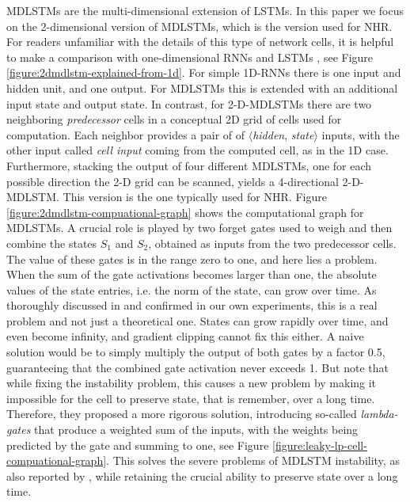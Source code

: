 \documentclass[conference]{IEEEtran}
\renewcommand{\ac}[1]{\gls{#1}}
\renewcommand{\acp}[1]{\glspl{#1}}
\begin{document}
\acp{MDLSTM} \cite{mdlstmsGraves2007} are the multi-dimensional extension of \acp{LSTM}. 
In this paper we focus on the 2-dimensional version of \acp{MDLSTM}, which is the version 
used for \ac{NHR}. For readers unfamiliar with the details of this type of network cells, it is helpful 
to make a comparison with one-dimensional \acp{RNN} and \acp{LSTM} \cite{Hochreiter:1997:LSMT}, 
see Figure \ref{figure:2dmdlstm-explained-from-1d}.
For simple 1D-\acp{RNN} there is one input and hidden unit, and one output. For \acp{MDLSTM} this is extended with an additional 
input state and output state. In contrast, for 2-D-\acp{MDLSTM} there are two 
neighboring \emph{predecessor} cells in a conceptual 2D grid of cells used for computation. Each neighbor provides a pair of 
of $\langle$\emph{hidden}, \emph{state}$\rangle$ inputs, with the other input called \emph{cell input}   
coming from the computed cell, as in the 1D case. 
Furthermore,  stacking the output of four different \acp{MDLSTM}, one for each possible direction 
the 2-D grid can be scanned, yields a 4-directional 2-D-\ac{MDLSTM}. 
This version is the one typically used for \ac{NHR}.
Figure \ref{figure:2dmdlstm-compuational-graph} shows the computational graph for \acp{MDLSTM}. A crucial role is played 
by two forget gates used to weigh and then combine the states $S_1$ and $S_2$, obtained as inputs from the two predecessor cells. 
The value of these gates is in the range zero to one, and here lies a problem. When the sum of the gate activations becomes larger than one, 
the absolute values of the state entries, i.e. the norm of the state, can grow over time. As thoroughly discussed in \cite{LeifertEtAl2014}
and confirmed in our own experiments, this is a real problem and not just a theoretical one. States can grow rapidly over time, 
and even become infinity, and gradient clipping cannot fix this either. A naive solution would be to simply multiply 
the output of both gates by a factor 0.5, guaranteeing that the combined gate activation never exceeds 1. But \cite{LeifertEtAl2014}
note that while fixing the instability problem, this causes a new problem by making it impossible for the cell to preserve state, that is 
remember, over a long time. Therefore, they proposed a more rigorous solution, introducing so-called \emph{lambda-gates} that 
produce a weighted sum of the inputs, with the weights being predicted by the gate and summing to one, see Figure \ref{figure:leaky-lp-cell-compuational-graph}. 
This solves the severe problems of \ac{MDLSTM} instability, as also reported by \cite{Voigtlaender2016}, 
while retaining the crucial ability to preserve state over a long time. 
\end{document}
